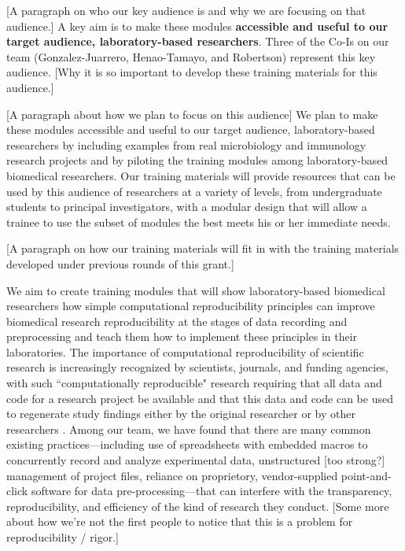 \documentclass[pdftex,english,11pt,parskip=half]{scrartcl}
\begin{document}
[A paragraph on who our key audience is and why we are focusing on that
audience.] A key aim is to make these modules \textbf{accessible and useful to
our target audience, laboratory-based researchers}. Three of the Co-Is on our
team (Gonzalez-Juarrero, Henao-Tamayo, and Robertson) represent this key
audience. [Why it is so important to develop these training materials for this
audience.]

[A paragraph about how we plan to focus on this audience] We plan to make these
modules accessible and useful to our target audience, laboratory-based
researchers by including examples from real microbiology and immunology research
projects and by piloting the training modules among laboratory-based biomedical
researchers. Our training materials will provide resources that can be used by
this audience of researchers at a variety of levels, from undergraduate students
to principal investigators, with a modular design that will allow a trainee to
use the subset of modules the best meets his or her immediate needs.

[A paragraph on how our training materials will fit in with the training
materials developed under previous rounds of this grant.]

We aim to create training modules that will show laboratory-based biomedical
researchers how simple computational reproducibility principles can improve
biomedical research reproducibility at the stages of data recording and
preprocessing and teach them how to implement these principles in their
laboratories. The importance of computational reproducibility of scientific
research is increasingly recognized by scientists, journals, and funding
agencies, with such ``computationally reproducible" research requiring that all
data and code for a research project be available and that this data and code
can be used to regenerate study findings either by the original researcher or by
other researchers \cite{ellis2018share, ram2013git}. Among our team, we have
found that there are many common existing practices---including use of
spreadsheets with embedded macros to concurrently record and analyze
experimental data, unstructured [too strong?] management of project files,
reliance on proprietory, vendor-supplied point-and-click software for data
pre-processing---that can interfere with the transparency, reproducibility, and
efficiency of the kind of research they conduct. [Some more about how we're not
the first people to notice that this is a problem for reproducibility / rigor.] 
\end{document}
